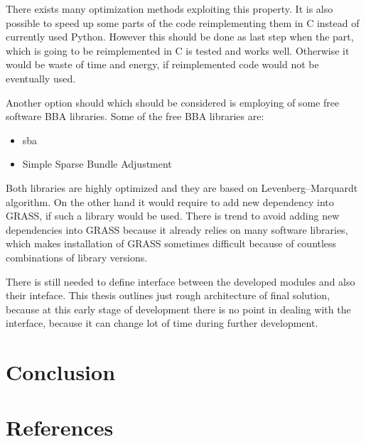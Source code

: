 \documentclass[a4paper,12pt]{article}
\begin{document}
There exists many optimization methods exploiting this property. 
It is also possible to speed up some parts of the code reimplementing them in C instead of currently used Python. However this should be done 
as last step when the part, which is going to be reimplemented in C is tested and works well. Otherwise it would be waste of time and energy, if reimplemented 
code would not be eventually used. 

Another option should which should  be considered is employing of some free software BBA libraries.
Some of the free BBA libraries are:
\begin{itemize}
\item sba
\item Simple Sparse Bundle Adjustment 
\end{itemize}

Both libraries are highly optimized and they are based on Levenberg–Marquardt algorithm.
On the other hand it would require to add new dependency into GRASS, if such a library would be used. 
There is trend to avoid adding new dependencies into GRASS because it already relies on many software libraries,
which makes installation of GRASS sometimes difficult because of countless combinations of library versions.



There is still needed to define interface between the developed modules and also their inteface. 
This thesis outlines just rough architecture of final solution, because at this early stage of development 
there is no point in dealing with the interface, because it can change lot of time during further development.


\section{Conclusion}

\section{References}







\end{document}
